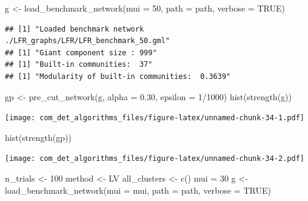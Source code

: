 \documentclass[
]{article}
\newenvironment{Shaded}{\begin{snugshade}}{\end{snugshade}}
\newcommand{\AttributeTok}[1]{\textcolor[rgb]{0.77,0.63,0.00}{#1}}
\newcommand{\ConstantTok}[1]{\textcolor[rgb]{0.00,0.00,0.00}{#1}}
\newcommand{\DecValTok}[1]{\textcolor[rgb]{0.00,0.00,0.81}{#1}}
\newcommand{\FloatTok}[1]{\textcolor[rgb]{0.00,0.00,0.81}{#1}}
\newcommand{\FunctionTok}[1]{\textcolor[rgb]{0.00,0.00,0.00}{#1}}
\newcommand{\NormalTok}[1]{#1}
\newcommand{\OtherTok}[1]{\textcolor[rgb]{0.56,0.35,0.01}{#1}}
\newcommand{\SpecialCharTok}[1]{\textcolor[rgb]{0.00,0.00,0.00}{#1}}
\newcommand{\StringTok}[1]{\textcolor[rgb]{0.31,0.60,0.02}{#1}}
\begin{document}
\begin{Shaded}
\begin{Highlighting}[]
\NormalTok{g }\OtherTok{\textless{}{-}} \FunctionTok{load\_benchmark\_network}\NormalTok{(}\AttributeTok{mui =} \DecValTok{50}\NormalTok{, }\AttributeTok{path =}\NormalTok{ path, }\AttributeTok{verbose =} \ConstantTok{TRUE}\NormalTok{)}
\end{Highlighting}
\end{Shaded}

\begin{verbatim}
## [1] "Loaded benchmark network ./LFR_graphs/LFR/LFR_benchmark_50.gml"
## [1] "Giant component size : 999"
## [1] "Built-in communities:  37"
## [1] "Modularity of built-in communities:  0.3639"
\end{verbatim}

\begin{Shaded}
\begin{Highlighting}[]
\NormalTok{gp }\OtherTok{\textless{}{-}} \FunctionTok{pre\_cut\_network}\NormalTok{(g,  }\AttributeTok{alpha =} \FloatTok{0.30}\NormalTok{, }\AttributeTok{epsilon =} \DecValTok{1}\SpecialCharTok{/}\DecValTok{1000}\NormalTok{)}
\FunctionTok{hist}\NormalTok{(}\FunctionTok{strength}\NormalTok{(g))}
\end{Highlighting}
\end{Shaded}

\texttt{[image: com\_det\_algorithms\_files/figure-latex/unnamed-chunk-34-1.pdf]}

\begin{Shaded}
\begin{Highlighting}[]
\FunctionTok{hist}\NormalTok{(}\FunctionTok{strength}\NormalTok{(gp))}
\end{Highlighting}
\end{Shaded}

\texttt{[image: com\_det\_algorithms\_files/figure-latex/unnamed-chunk-34-2.pdf]}

\newpage

\begin{Shaded}
\begin{Highlighting}[]
\NormalTok{n\_trials }\OtherTok{\textless{}{-}} \DecValTok{100}
\NormalTok{method }\OtherTok{\textless{}{-}} \StringTok{\textquotesingle{}LV\textquotesingle{}}
\NormalTok{all\_clusters }\OtherTok{\textless{}{-}} \FunctionTok{c}\NormalTok{()}
\NormalTok{mui }\OtherTok{=} \DecValTok{30}
\NormalTok{g }\OtherTok{\textless{}{-}} \FunctionTok{load\_benchmark\_network}\NormalTok{(}\AttributeTok{mui =}\NormalTok{ mui, }\AttributeTok{path =}\NormalTok{ path, }\AttributeTok{verbose =} \ConstantTok{TRUE}\NormalTok{)}
\end{Highlighting}
\end{Shaded}
\end{document}

